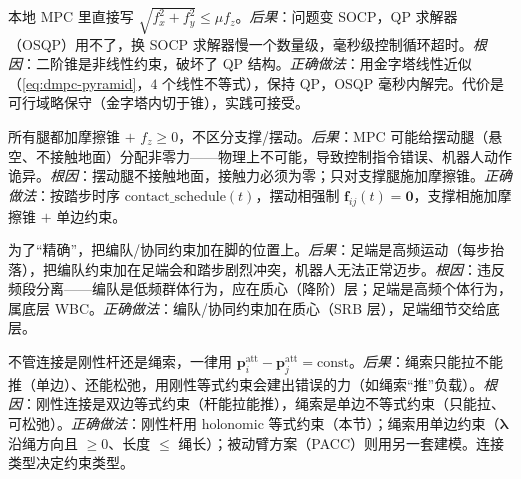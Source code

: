 \begin{pitfall}
本地 MPC 里直接写 $\sqrt{f_x^2+f_y^2}\le\mu f_z$。\emph{后果}：问题变 SOCP，QP 求解器（OSQP）用不了，换 SOCP 求解器慢一个数量级，毫秒级控制循环超时。\emph{根因}：二阶锥是非线性约束，破坏了 QP 结构。\emph{正确做法}：用金字塔线性近似（\cref{eq:dmpc-pyramid}，$4$ 个线性不等式），保持 QP，OSQP 毫秒内解完。代价是可行域略保守（金字塔内切于锥），实践可接受。
\end{pitfall}

\begin{pitfall}
所有腿都加摩擦锥 $+$ $f_z\ge0$，不区分支撑/摆动。\emph{后果}：MPC 可能给摆动腿（悬空、不接触地面）分配非零力——物理上不可能，导致控制指令错误、机器人动作诡异。\emph{根因}：摆动腿不接触地面，接触力必须为零；只对支撑腿施加摩擦锥。\emph{正确做法}：按踏步时序 $\text{contact\_schedule}(t)$，摆动相强制 $\mathbf{f}_{ij}(t)=\mathbf{0}$，支撑相施加摩擦锥 $+$ 单边约束。
\end{pitfall}

\begin{pitfall}
为了“精确”，把编队/协同约束加在脚的位置上。\emph{后果}：足端是高频运动（每步抬落），把编队约束加在足端会和踏步剧烈冲突，机器人无法正常迈步。\emph{根因}：违反频段分离——编队是低频群体行为，应在质心（降阶）层；足端是高频个体行为，属底层 WBC。\emph{正确做法}：编队/协同约束加在质心（SRB 层），足端细节交给底层。
\end{pitfall}

\begin{pitfall}
不管连接是刚性杆还是绳索，一律用 $\mathbf{p}_i^{\text{att}}-\mathbf{p}_j^{\text{att}}=\text{const}$。\emph{后果}：绳索只能拉不能推（单边）、还能松弛，用刚性等式约束会建出错误的力（如绳索“推”负载）。\emph{根因}：刚性连接是双边等式约束（杆能拉能推），绳索是单边不等式约束（只能拉、可松弛）。\emph{正确做法}：刚性杆用 holonomic 等式约束（本节）；绳索用单边约束（$\boldsymbol{\lambda}$ 沿绳方向且 $\ge0$、长度 $\le$ 绳长）；被动臂方案（PACC\cite{turrisi2024pacc}）则用另一套建模。连接类型决定约束类型。
\end{pitfall}

